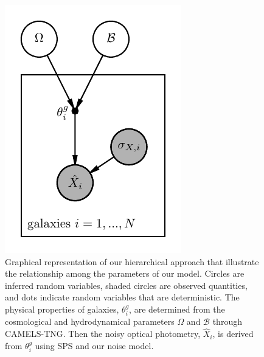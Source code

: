 \begin{figure}[ht]
\begin{center}
    \centerline{\includegraphics[width=0.5\columnwidth]{figs/graph.pdf}}
    \vskip -0.1in
    \caption{
        Graphical representation of our hierarchical approach that illustrate
        the relationship among the parameters of our model. 
        Circles are inferred random variables, shaded circles are observed
        quantities, and dots indicate random variables that are deterministic.
        The physical properties of galaxies, $\theta^g_i$, are determined from
        the cosmological and hydrodynamical parameters $\Omega$ and
        $\mathcal{B}$ through CAMELS-TNG. 
        Then the noisy optical photometry, $\hat{X}_i$, is derived from
        $\theta^g_i$ using SPS and our noise model. 
    }\label{fig:graph}
\end{center}
\vskip -0.3in
\end{figure}

